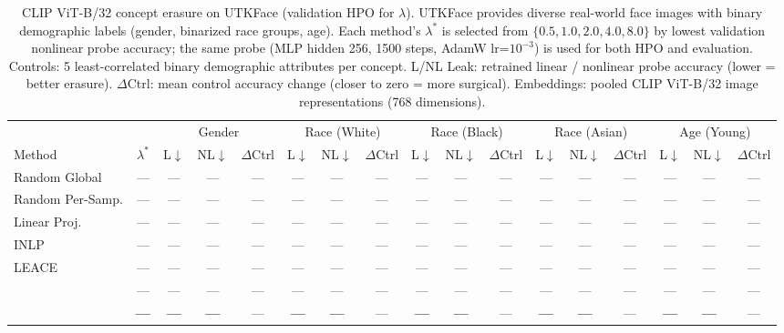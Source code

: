 \begin{table}[t]
\centering
\caption{CLIP ViT-B/32 concept erasure on UTKFace (validation HPO for $\lambda$). UTKFace provides diverse real-world face images with binary demographic labels (gender, binarized race groups, age). Each method's $\lambda^*$ is selected from $\{0.5, 1.0, 2.0, 4.0, 8.0\}$ by lowest validation nonlinear probe accuracy; the same probe (MLP hidden 256, 1500 steps, AdamW lr=$10^{-3}$) is used for both HPO and evaluation. Controls: 5 least-correlated binary demographic attributes per concept. L/NL Leak: retrained linear / nonlinear probe accuracy (lower = better erasure). $\Delta$Ctrl: mean control accuracy change (closer to zero = more surgical). Embeddings: pooled CLIP ViT-B/32 image representations (768 dimensions).}
\label{tab:utkface_clip_fair}
\small
\setlength{\tabcolsep}{3.5pt}
\begin{tabular}{l c|ccc|ccc|ccc|ccc|ccc}
\toprule
 & & \multicolumn{3}{c|}{Gender} & \multicolumn{3}{c|}{Race (White)} & \multicolumn{3}{c|}{Race (Black)} & \multicolumn{3}{c|}{Race (Asian)} & \multicolumn{3}{c}{Age (Young)} \\
Method & $\lambda^*$ & L$\downarrow$ & NL$\downarrow$ & $\Delta$Ctrl & L$\downarrow$ & NL$\downarrow$ & $\Delta$Ctrl & L$\downarrow$ & NL$\downarrow$ & $\Delta$Ctrl & L$\downarrow$ & NL$\downarrow$ & $\Delta$Ctrl & L$\downarrow$ & NL$\downarrow$ & $\Delta$Ctrl \\
\midrule
Random Global    & --- & --- & --- & --- & --- & --- & --- & --- & --- & --- & --- & --- & --- & --- & --- & --- \\
Random Per-Samp. & --- & --- & --- & --- & --- & --- & --- & --- & --- & --- & --- & --- & --- & --- & --- & --- \\
Linear Proj.     & --- & --- & --- & --- & --- & --- & --- & --- & --- & --- & --- & --- & --- & --- & --- & --- \\
INLP             & --- & --- & --- & --- & --- & --- & --- & --- & --- & --- & --- & --- & --- & --- & --- & --- \\
LEACE            & --- & --- & --- & --- & --- & --- & --- & --- & --- & --- & --- & --- & --- & --- & --- & --- \\
\AmbGCE{}      & --- & --- & --- & --- & --- & --- & --- & --- & --- & --- & --- & --- & --- & --- & --- & --- \\
\textbf{\TanGCE{}} & \textbf{---} & \textbf{---} & \textbf{---} & --- & \textbf{---} & \textbf{---} & --- & \textbf{---} & \textbf{---} & --- & \textbf{---} & \textbf{---} & --- & \textbf{---} & \textbf{---} & --- \\
\bottomrule
\end{tabular}
\end{table}

